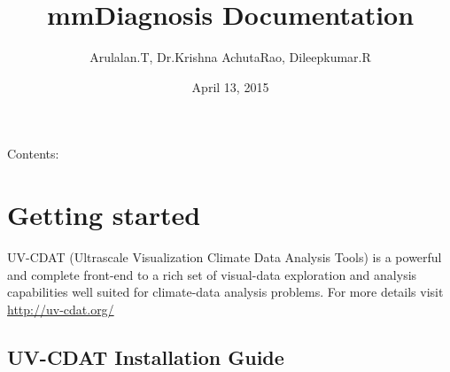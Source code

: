 \documentclass[letterpaper,10pt,english]{sphinxmanual}
\title{mmDiagnosis Documentation}
\date{April 13, 2015}
\author{Arulalan.T, Dr.Krishna AchutaRao, Dileepkumar.R}
\begin{document}
\maketitle
\tableofcontents
{}\label{index::doc}


Contents:


\chapter{Getting started}
\label{getting_started:getting-started}\label{getting_started::doc}\label{getting_started:id1}\label{getting_started:welcome-to-mmdiagnosis-s-documentation}
UV-CDAT (Ultrascale Visualization Climate Data Analysis Tools) is a powerful and complete front-end to a rich set of visual-data exploration and analysis capabilities well suited for climate-data analysis problems. For more details visit \href{http://uv-cdat.org/}{http://uv-cdat.org/}


\section{UV-CDAT Installation Guide}
\label{getting_started:uv-cdat-installation-guide}
\end{document}
